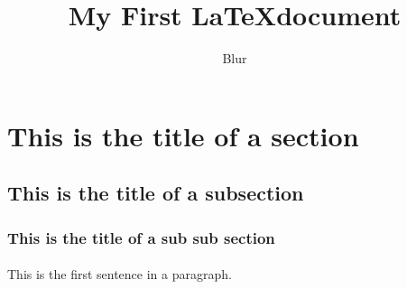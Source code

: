 \documentclass{article}
\begin{document}
\section{This is the title of a section}
\subsection{This is the title of a subsection}
\subsubsection{This is the title of a sub sub section}
\paragraph{}
This is the first sentence in a paragraph.

\author{Blur}
\title{My First \LaTeX document}
\maketitle
\end{document}
